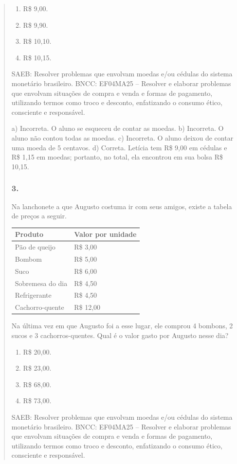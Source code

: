 \begin{enumerate}
\begin{escolha}
\begin{enumerate}
\begin{itemize}
\begin{itemize}
\begin{escolha}
\begin{quote}
\begin{escolha}
\begin{enumerate}
\def\labelenumi{\alph{enumi})}
\item
  R\$ 9,00.
\item
  R\$ 9,90.
\item
  R\$ 10,10.
\item
  R\$ 10,15.
\end{enumerate}

SAEB: Resolver problemas que envolvam moedas e/ou cédulas do sistema monetário brasileiro.
BNCC: EF04MA25 -- Resolver e elaborar problemas que envolvam situações de compra e venda e formas
de pagamento, utilizando termos como troco e desconto, enfatizando o consumo ético, consciente e
responsável.

a) Incorreta. O aluno se esqueceu de contar as moedas.
b) Incorreta. O aluno não contou todas as moedas.
c) Incorreta. O aluno deixou de contar uma moeda de 5 centavos.
d) Correta. Letícia tem R\$ 9,00 em cédulas e R\$ 1,15 em moedas; portanto, no total, ela
encontrou em sua bolsa R\$ 10,15.

\subsubsection{3.}\label{section-77}

Na lanchonete a que Augusto costuma ir com seus amigos, existe a tabela de preços a seguir.

\begin{longtable}[]{@{}ll@{}}
\toprule
Produto & Valor por unidade\tabularnewline
\midrule
\endhead
Pão de queijo & R\$ 3,00\tabularnewline
Bombom & R\$ 5,00\tabularnewline
Suco & R\$ 6,00\tabularnewline
Sobremesa do dia & R\$ 4,50\tabularnewline
Refrigerante & R\$ 4,50\tabularnewline
Cachorro-quente & R\$ 12,00\tabularnewline
\bottomrule
\end{longtable}

Na última vez em que Augusto foi a esse lugar, ele comprou 4 bombons, 2
sucos e 3 cachorros-quentes. Qual é o valor gasto por Augusto nesse dia?

\begin{enumerate}
\def\labelenumi{\alph{enumi})}
\item
  R\$ 20,00.
\item
  R\$ 23,00.
\item
  R\$ 68,00.
\item
  R\$ 73,00.
\end{enumerate}

SAEB: Resolver problemas que envolvam moedas e/ou cédulas do sistema monetário brasileiro.
BNCC: EF04MA25 -- Resolver e elaborar problemas que envolvam situações de compra e venda e formas
de pagamento, utilizando termos como troco e desconto, enfatizando o consumo ético, consciente e
responsável.


\end{escolha}
\end{quote}
\end{escolha}
\end{itemize}
\end{itemize}
\end{enumerate}
\end{escolha}
\end{enumerate}
